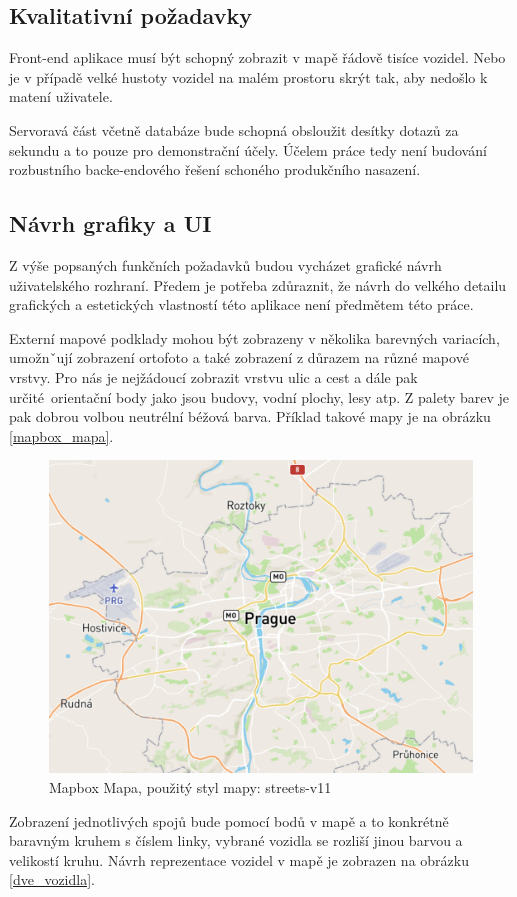 \subsection{Kvalitativní požadavky}

Front-end aplikace musí být schopný zobrazit v mapě řádově tisíce vozidel. Nebo je v případě velké hustoty vozidel na malém prostoru skrýt tak, aby nedošlo k matení uživatele.

\bigbreak

Servoravá část včetně databáze bude schopná obsloužit desítky dotazů za sekundu a to pouze pro demonstrační účely. Účelem práce tedy není budování rozbustního backe-endového řešení schoného produkčního nasazení.

\subsection{Návrh grafiky a UI}

Z výše popsaných funkčních požadavků budou vycházet grafické návrh uživatelského rozhraní. Předem je potřeba zdůraznit, že návrh do velkého detailu grafických a estetických vlastností této aplikace není předmětem této práce.

\bigbreak

Externí mapové podklady mohou být zobrazeny v několika barevných variacích, umožnˇují zobrazení ortofoto a také zobrazení z důrazem na různé mapové vrstvy. Pro nás je nejžádoucí zobrazit vrstvu ulic a cest a dále pak určité orientační body jako jsou budovy, vodní plochy, lesy atp. Z palety barev je pak dobrou volbou neutrélní béžová barva. Příklad takové mapy je na obrázku \ref{mapbox_mapa}.

\begin{figure}
	\centering
  \includegraphics[width=0.5\linewidth]{../img/mapa_mapbox.png}
  \caption{Mapbox Mapa, použitý styl mapy: streets-v11}
  \label{fig:mapbox_mapa}
\end{figure}

Zobrazení jednotlivých spojů bude pomocí bodů v mapě a to konkrétně baravným kruhem s číslem linky, vybrané vozidla se rozliší jinou barvou a velikostí kruhu. Návrh reprezentace vozidel v mapě je zobrazen na obrázku \ref{dve_vozidla}.

